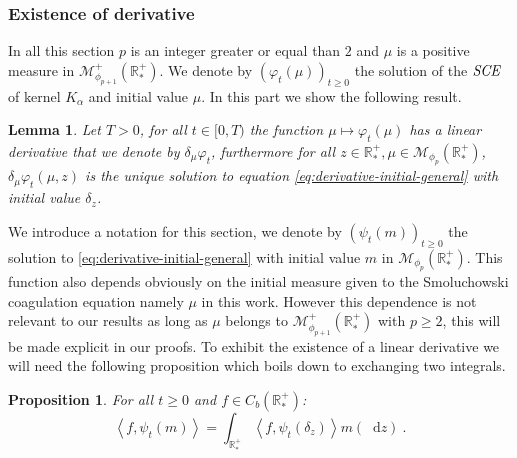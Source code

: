 \documentclass[11pt,a4paper]{article}
\newcommand{\RRP}{\mathbb{R}^+_*}
\newcommand{\MC}{\mathcal{M}}
\newcommand{\SCE}{\emph{SCE}}
\newcommand{\Proc}[1]{\left(#1\right)_{t\geq 0}}
\newcommand{\brac}[1]{\left\langle#1\right\rangle}
\newcommand{\dd}{\mathop{}\!\mathrm{d}}
\newtheorem{lemma}[theorem]{Lemma}
\newtheorem{proposition}[theorem]{Proposition}
\begin{document}
\subsubsection{Existence of derivative}
In all this section $p$ is an integer greater or equal than $2$ and $\mu$ is a positive measure in $\MC^+_{\phi_{p+1}}(\RRP)$. We denote by $\Proc{\varphi_t(\mu)}$ the solution of the $\SCE$ of kernel $K_\alpha$ and initial value $\mu$. In this part we show the following result.
\begin{lemma}\label{lem:derivative-existence-and-eq}
    Let $T > 0$, for all $t \in [0,T)$ the function $ \mu \mapsto \varphi_t(\mu)$ has a linear derivative that we denote by $\delta_\mu\varphi_t$, furthermore for all $z \in \RRP, \mu \in \MC_{\phi_p}(\RRP)$, $\delta_\mu\varphi_t(\mu,z)$ is the unique solution to equation \eqref{eq:derivative-initial-general} with initial value $\delta_z$.
\end{lemma}
We introduce a notation for this section, we denote by $\Proc{\psi_t(m)}$ the solution to \eqref{eq:derivative-initial-general} with initial value $m$ in $\MC_{\phi_p}(\RRP)$. This function also depends obviously on the initial measure given to the Smoluchowski coagulation equation namely $\mu$ in this work. However this dependence is not relevant to our results as long as $\mu$ belongs to $\MC^+_{\phi_{p+1}}(\RRP)$ with $p\geq 2$, this will be made explicit in our proofs. To exhibit the existence of a linear derivative we will need the following proposition which boils down to exchanging two integrals.
\begin{proposition}\label{prop:derivative-prop-fubini}
    For all $t \geq 0$ and $f \in C_b(\RRP)$:
    \[\brac{f,\psi_t(m)} = \int_{\RRP} \brac{f,\psi_t\left(\delta_z\right)}m(\dd z)\ .\]
\end{proposition}
\end{document}
